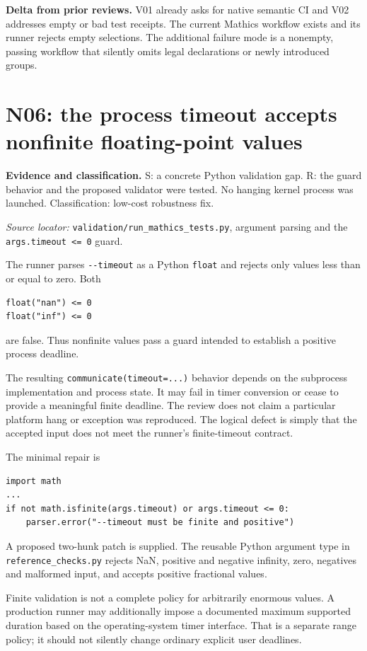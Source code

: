 \documentclass[11pt,letterpaper]{article}
\newcommand{\code}[1]{\nolinkurl{#1}}
\newcommand{\source}[1]{\par\textit{Source locator:} #1\par}
\newcommand{\status}[1]{\par\textbf{Evidence and classification.} #1\par}
\newcommand{\novelty}[1]{\par\textbf{Delta from prior reviews.} #1\par}
\begin{document}
\novelty{V01 already asks for native semantic CI and V02 addresses empty or
bad test receipts. The current Mathics workflow exists and its runner rejects
empty selections. The additional failure mode is a nonempty, passing workflow
that silently omits legal declarations or newly introduced groups.}

\section{N06: the process timeout accepts nonfinite floating-point values}
\label{sec:timeout}
\status{S: a concrete Python validation gap. R: the guard behavior and the
proposed validator were tested. No hanging kernel process was launched.
Classification: low-cost robustness fix.}
\source{\code{validation/run_mathics_tests.py}, argument parsing and the
\code{args.timeout <= 0} guard. \cite{repo-runner}}

The runner parses \code{--timeout} as a Python \code{float} and rejects only
values less than or equal to zero. Both
\begin{lstlisting}
float("nan") <= 0
float("inf") <= 0
\end{lstlisting}
are false. Thus nonfinite values pass a guard intended to establish a
positive process deadline.

The resulting \code{communicate(timeout=...)} behavior depends on the
subprocess implementation and process state. It may fail in timer conversion
or cease to provide a meaningful finite deadline. The review does not claim
a particular platform hang or exception was reproduced. The logical defect
is simply that the accepted input does not meet the runner's finite-timeout
contract.

The minimal repair is
\begin{lstlisting}
import math
...
if not math.isfinite(args.timeout) or args.timeout <= 0:
    parser.error("--timeout must be finite and positive")
\end{lstlisting}
A proposed two-hunk patch is supplied. The reusable Python argument type in
\code{reference_checks.py} rejects NaN, positive and negative infinity,
zero, negatives and malformed input, and accepts positive fractional values.

Finite validation is not a complete policy for arbitrarily enormous values.
A production runner may additionally impose a documented maximum supported
duration based on the operating-system timer interface. That is a separate
range policy; it should not silently change ordinary explicit user deadlines.
\end{document}
